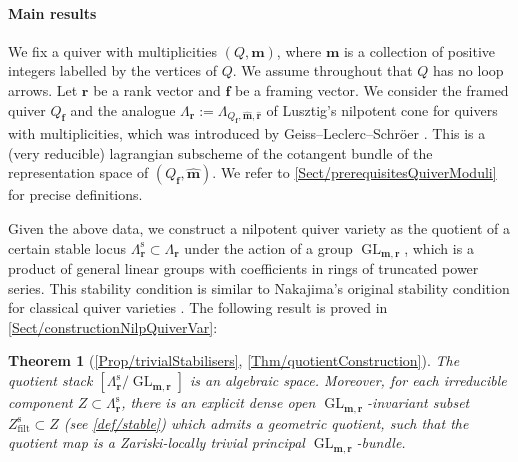 \documentclass[a4paper,12pt]{article}
\theoremstyle{definition}
\theoremstyle{plain}
\newtheorem{theoremAlph}{Theorem}
\theoremstyle{remark}
\DeclareMathOperator{\GL}{GL}
\newcommand{\st}{\mathrm{s}}
\newcommand\bff{\mathbf{f}}
\newcommand\bfm{\mathbf{m}}
\newcommand\bfr{\mathbf{r}}
\begin{document}
\paragraph*{Main results}

We fix a quiver with multiplicities $(Q,\bfm)$, where $\bfm$ is a collection of positive integers labelled by the vertices of $Q$. We assume throughout that $Q$ has no loop arrows. Let $\bfr$ be a rank vector and $\bff$ be a framing vector. We consider the framed quiver $Q_\bff$ and the analogue $\Lambda_\bfr:=\Lambda_{Q_\bff,\widehat{\bfm},\widehat{\bfr}}$ of Lusztig's nilpotent cone \cite{Lus91} for quivers with multiplicities, which was introduced by Geiss--Leclerc--Schröer \cite{GLS18a}. This is a (very reducible) lagrangian subscheme of the cotangent bundle of the representation space of $(Q_\bff,\widehat{\bfm})$. We refer to \cref{Sect/prerequisitesQuiverModuli} for precise definitions.

Given the above data, we construct a nilpotent quiver variety as the quotient of a certain stable locus $\Lambda_\bfr^\st\subset\Lambda_\bfr$ under the action of a group $\GL_{\bfm,\bfr}$, which is a product of general linear groups with coefficients in rings of truncated power series. This stability condition is similar to Nakajima's original stability condition for classical quiver varieties \cite{Nak94}. The following result is proved in \cref{Sect/constructionNilpQuiverVar}:

\begin{theoremAlph}[\cref{Prop/trivialStabilisers}, \cref{Thm/quotientConstruction}]\label{MainThm/quotientConstruction}
The quotient stack $\left[\Lambda_\bfr^\st/\GL_{\bfm,\bfr}\right]$ is an algebraic space. Moreover, for each irreducible component $Z\subset\Lambda_\bfr^\st$, there is an \emph{explicit} dense open $\GL_{\bfm,\bfr}$-invariant subset $Z_{\mathrm{filt}}^\st\subset Z$ (see \cref{def/stable}) which admits a geometric quotient, such that the quotient map is a Zariski-locally trivial principal $\GL_{\bfm,\bfr}$-bundle.
\end{theoremAlph}
\end{document}
